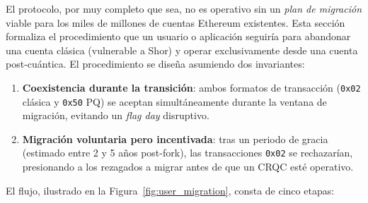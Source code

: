 El protocolo, por muy completo que sea, no es operativo sin un \emph{plan de migración} viable para los miles de millones de cuentas Ethereum existentes. Esta sección formaliza el procedimiento que un usuario o aplicación seguiría para abandonar una cuenta clásica (vulnerable a Shor) y operar exclusivamente desde una cuenta post-cuántica. El procedimiento se diseña asumiendo dos invariantes:
\begin{enumerate}
  \item \textbf{Coexistencia durante la transición}: ambos formatos de transacción (\texttt{0x02} clásica y \texttt{0x50} PQ) se aceptan simultáneamente durante la ventana de migración, evitando un \emph{flag day} disruptivo.
  \item \textbf{Migración voluntaria pero incentivada}: tras un periodo de gracia (estimado entre 2 y 5 años post-fork), las transacciones \texttt{0x02} se rechazarían, presionando a los rezagados a migrar antes de que un CRQC esté operativo.
\end{enumerate}

El flujo, ilustrado en la Figura~\ref{fig:user_migration}, consta de cinco etapas:

